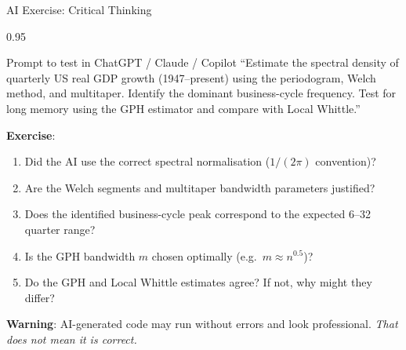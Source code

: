 \documentclass[9pt, aspectratio=169, t]{beamer}
\begin{document}
\begin{frame}{AI Exercise: Critical Thinking}
    \begin{cminipage}{0.95\textwidth}
    \vspace{-0.3cm}
    \begin{block}{\footnotesize Prompt to test in ChatGPT / Claude / Copilot}
        {\footnotesize
        ``Estimate the spectral density of quarterly US real GDP growth (1947--present) using the periodogram, Welch method, and multitaper. Identify the dominant business-cycle frequency. Test for long memory using the GPH estimator and compare with Local Whittle.''
        }
    \end{block}
    \vspace{-2mm}
    {\footnotesize
    \textbf{Exercise}:
    \begin{enumerate}\setlength{\itemsep}{0pt}
        \item Did the AI use the correct spectral normalisation ($1/(2\pi)$ convention)?
        \item Are the Welch segments and multitaper bandwidth parameters justified?
        \item Does the identified business-cycle peak correspond to the expected 6--32 quarter range?
        \item Is the GPH bandwidth $m$ chosen optimally (e.g.\ $m \approx n^{0.5}$)?
        \item Do the GPH and Local Whittle estimates agree? If not, why might they differ?
    \end{enumerate}
    }
    \vspace{-2mm}
    \begin{alertblock}{}
        {\footnotesize \textbf{Warning}: AI-generated code may run without errors and look professional. \textit{That does not mean it is correct.}}
    \end{alertblock}
    \end{cminipage}
\end{frame}

\end{document}
